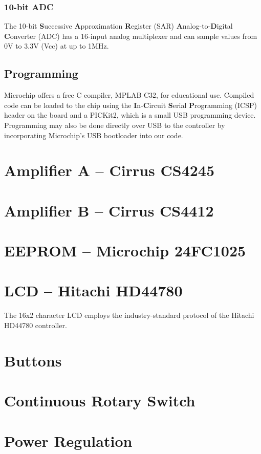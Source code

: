 \subsubsection{10-bit ADC}
The 10-bit \textbf{S}uccessive \textbf{A}pproximation \textbf{R}egister (SAR) \textbf{A}nalog-to-\textbf{D}igital \textbf{C}onverter (ADC) has a 16-input analog multiplexer and can sample values from 0V to 3.3V (Vcc) at up to 1MHz.

\subsection{Programming}
Microchip offers a free C compiler, MPLAB C32, for educational use. Compiled code can be loaded to the chip using the \textbf{I}n-\textbf{C}ircuit \textbf{S}erial \textbf{P}rogramming (ICSP) header on the board and a PICKit2, which is a small USB programming device. Programming may also be done directly over USB to the controller by incorporating Microchip's USB bootloader into our code.

\section{Amplifier A -- Cirrus CS4245}

\section{Amplifier B -- Cirrus CS4412}

\section{EEPROM -- Microchip 24FC1025}

\section{LCD -- Hitachi HD44780}
The 16x2 character LCD employs the industry-standard protocol of the Hitachi HD44780 controller.

\section{Buttons}

\section{Continuous Rotary Switch}

\section{Power Regulation}

